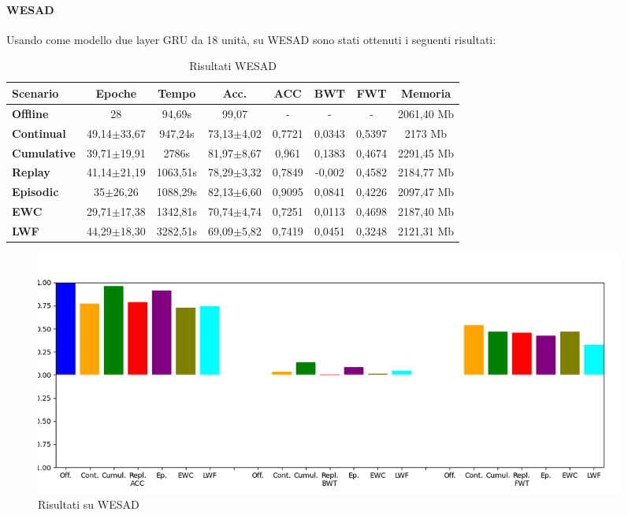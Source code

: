 \paragraph{WESAD} Usando come modello due layer GRU da 18 unità, su WESAD sono stati ottenuti i seguenti risultati:
\pagebreak
\begin{table}[h]
\footnotesize
    \begin{tabular}{l|c|c|c|c|c|c|c}
        \textbf{Scenario} & \textbf{Epoche} & \textbf{Tempo} & \textbf{Acc.} & \textbf{ACC} & \textbf{BWT} & \textbf{FWT} & \textbf{Memoria}\\
        \hline
        \textbf{Offline} & 28 & 94,69s & 99,07 & - & - & - & 2061,40 Mb\\
        \textbf{Continual} & 49,14$\pm$33,67 & 947,24s & 73,13$\pm$4,02 & 0,7721 & 0,0343 & 0,5397 & 2173 Mb\\
        \textbf{Cumulative} & 39,71$\pm$19,91 & 2786s & 81,97$\pm$8,67 & 0,961 & 0,1383 & 0,4674 & 2291,45 Mb\\
        \textbf{Replay} & 41,14$\pm$21,19 & 1063,51s & 78,29$\pm$3,32 & 0,7849 & -0,002 & 0,4582 & 2184,77 Mb\\
        \textbf{Episodic} & 35$\pm$26,26 & 1088,29s & 82,13$\pm$6,60 & 0,9095 & 0,0841 & 0,4226 & 2097,47 Mb\\
        \textbf{EWC} & 29,71$\pm$17,38 & 1342,81s & 70,74$\pm$4,74 & 0,7251 & 0,0113 & 0,4698 & 2187,40 Mb\\
        \textbf{LWF} & 44,29$\pm$18,30 & 3282,51s & 69,09$\pm$5,82 & 0,7419 & 0,0451 & 0,3248 & 2121,31 Mb\\
    \end{tabular}
    \caption{Risultati WESAD}
    \label{tab:reswesad}
\end{table}
\begin{figure}[h]
	\begin{center}
		\includegraphics[width=0.95\textwidth]{img/graphs/wesad_final_metrics.png}
		\caption{Risultati su WESAD}
		\label{fig:wesad_metrics_graph}
	\end{center}
\end{figure}
